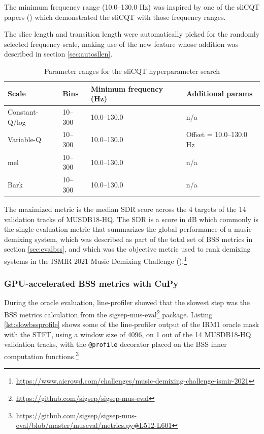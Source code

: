 \documentclass[report.tex]{subfiles}
\begin{document}
The minimum frequency range (10.0--130.0 Hz) was inspired by one of the sliCQT papers (\cite{slicq}) which demonstrated the sliCQT with those frequency ranges.

The slice length and transition length were automatically picked for the randomly selected frequency scale, making use of the new feature whose addition was described in section \ref{sec:autosllen}.

\begin{table}[ht]
	\centering
\begin{tabular}{ |l|l|l|l| }
	 \hline
	 Scale & Bins & Minimum frequency (Hz) & Additional params \\
	 \hline
	 \hline
	 Constant-Q/log & 10--300 & 10.0--130.0 & n/a \\
	 \hline
	 Variable-Q & 10--300 & 10.0--130.0 & Offset = 10.0--130.0 Hz \\
	 \hline
	 \hline
	 mel & 10--300 & 10.0--130.0 & n/a \\
	 \hline
	 Bark & 10--300 & 10.0--130.0 & n/a \\
	 \hline
\end{tabular}
	\caption{Parameter ranges for the sliCQT hyperparameter search}
	\label{table:slicqparams}
\end{table}

The maximized metric is the median SDR score across the 4 targets of the 14 validation tracks of MUSDB18-HQ. The SDR is a score in dB which commonly is the single evaluation metric that summarizes the global performance of a music demixing system, which was described as part of the total set of BSS metrics in section \ref{sec:evalbss}, and which was the objective metric used to rank demixing systems in the ISMIR 2021 Music Demixing Challenge (\cite{mdx21}).\footnote{\url{https://www.aicrowd.com/challenges/music-demixing-challenge-ismir-2021}}

\newpagefill

\subsubsection{GPU-accelerated BSS metrics with CuPy}
\label{sec:fasterbsscupy}

During the oracle evaluation, line-profiler showed that the slowest step was the BSS metrics calculation from the sigsep-mus-eval\footnote{\url{https://github.com/sigsep/sigsep-mus-eval}} package. Listing \ref{lst:slowbssprofile} shows some of the line-profiler output of the IRM1 oracle mask with the STFT, using a window size of 4096, on 1 out of the 14 MUSDB18-HQ validation tracks, with the \Verb#@profile# decorator placed on the BSS inner computation functions.\footnote{\url{https://github.com/sigsep/sigsep-mus-eval/blob/master/museval/metrics.py\#L512-L601}}
\end{document}
